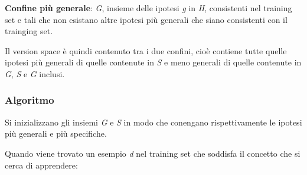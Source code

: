 \textbf{Confine più generale}: \emph{G}, insieme delle ipotesi \emph{g}
in \emph{H}, consistenti nel training set e tali che non esistano altre
ipotesi più generali che siano consistenti con il trainging set.

Il version space è quindi contenuto tra i due confini, cioè contiene
tutte quelle ipotesi più generali di quelle contenute in \emph{S} e meno
generali di quelle contenute in \emph{G}, \emph{S} e \emph{G} inclusi.

\subsubsection{Algoritmo}\label{algoritmo}

Si inizializzano gli insiemi \emph{G} e \emph{S} in modo che conengano
rispettivamente le ipotesi più generali e più specifiche.


Quando viene trovato un esempio \emph{d} nel training set che soddisfa
il concetto che si cerca di apprendere:

